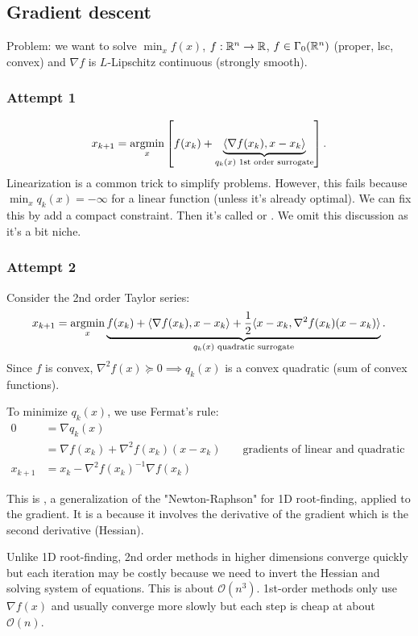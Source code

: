 \documentclass[class=article,crop=false]{standalone}
\begin{document}
\subsection{Gradient descent}

Problem: we want to solve $ \min_{x} f(x)$, $ f:\mathbb{R}^{n} \to \mathbb{R}$, $ f \in \Gamma_0 (\mathbb{R}^{n})$ (proper, lsc, convex) and $ \nabla f$ is $L$-Lipschitz continuous (strongly smooth).

\subsubsection{Attempt 1}
\[
	x_{k+1} = \operatorname*{argmin}_{x} \left[ f(x_k) + \underbrace{ \langle \nabla f(x_k), x- x_k \rangle}_{q_k (x) \text{ 1st order surrogate} } \right]
.\]
Linearization is a common trick to simplify problems. However, this fails because $ \min_{x} q_k(x) = -\infty$ for a linear function (unless it's already optimal). We can fix this by add a compact constraint. Then it's called  or . We omit this discussion as it's a bit niche.

\subsubsection{Attempt 2}
Consider the 2nd order Taylor series:
\[
	x_{k+1} = \operatorname*{argmin}_{x} \underbrace{ f(x_k) + \langle \nabla f(x_k) , x-x_k \rangle + \frac{1}{2} \langle x-x_k, \nabla ^2 f(x_k) (x-x_k) \rangle}_{q_k(x) \text{ quadratic surrogate} }
.\] 
Since $ f$ is convex,  $ \nabla ^2 f(x) \succeq 0 \implies q_k(x)$ is a convex quadratic (sum of convex functions). 

To minimize $ q_k(x)$, we use Fermat's rule:
\begin{align*}
	0 &= \nabla q_k(x) \\
	  &= \nabla f(x_k) + \nabla ^2 f(x_k) (x-x_k) &&\text{ gradients of linear and quadratic terms} \\
	x_{k+1} &= x_k - \nabla ^2 f(x_k)^{-1} \nabla f(x_k) 
\end{align*}

This is , a generalization of the "Newton-Raphson" for 1D root-finding, applied to the gradient. It is a  because it involves the derivative of the gradient which is the second derivative (Hessian). 

\begin{remark}
	Unlike 1D root-finding, 2nd order methods in higher dimensions converge quickly but each iteration may be costly because we need to invert the Hessian and solving system of equations. This is about $ \mathcal{ O}(n^3)$. 1st-order methods only use $ \nabla f(x)$ and usually converge more slowly but each step is cheap at about $ \mathcal{ O}(n)$.
\end{remark}
\end{document}
